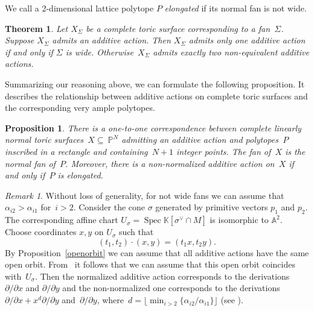 \documentclass[a4paper,draft,reqno,12pt]{amsart}
\newtheorem{proposition}{Proposition}
\newtheorem{theorem}{Theorem}
\theoremstyle{definition}
\theoremstyle{definition}
\theoremstyle{remark}
\newtheorem {remark}{Remark}
\DeclareMathOperator{\Spec}{Spec}
\def\BK{{\mathbb K}}
\def\BK{{\mathbb K}}
\def\BP{{\mathbb P}}
\def\BA{{\mathbb A}}
\begin{document}
We call a 2-dimensional lattice polytope $P$ \emph{elongated} if its normal fan is not wide.

\begin{theorem}\label{surfacesuntheorem}\cite[Theorem 3]{DZ} Let $X_\Sigma$ be a complete toric surface corresponding to a fan~$\Sigma$. Suppose $X_\Sigma$ admits an additive action. Then $X_\Sigma$ admits only one additive action if and only if $\Sigma$ is wide. Otherwise~$X_\Sigma$ admits exactly two non-equivalent additive actions.

\end{theorem}

Summarizing our reasoning above, we can formulate the following proposition. It describes the relationship between additive actions on complete toric surfaces and the corresponding very ample polytopes. 

\begin{proposition}There is a one-to-one correspondence between complete linearly normal toric surfaces~$X\subseteq~\BP^N$ admitting an additive action and polytopes~$P$ inscribed in a rectangle and containing~$N+1$ integer points. The fan of~$X$ is the normal fan of~$P$.
Moreover, there is a non-normalized additive action on~$X$ if and only if~$P$ is elongated.
\end{proposition}

\begin{remark}\label{derivationweight}
    Without loss of generality, for not wide fans we can assume that $\alpha_{i2}>\alpha_{i1}$ for~$i>2$. Consider the cone $\sigma$ generated by primitive vectors $p_1$ and $p_2$. The corresponding affine chart $U_\sigma=\Spec\BK[\sigma^{\vee}\cap M]$ is isomorphic to $\BA^2$. Choose coordinates $x, y$ on $U_\sigma$ such that\begin{equation*}
        (t_1,t_2)\cdot(x,y) = (t_1x,t_2y).
    \end{equation*} By Proposition~\ref{openorbit} we can assume that all additive actions have the same open orbit. From~\cite[Section 6]{DZ} it follows that we can assume that this open orbit coincides with~$U_\sigma$. Then the normalized additive action corresponds to the derivations $\partial/\partial x$ and $\partial/\partial y$ and the non-normalized one corresponds to the derivations $\partial/\partial x + x^d\partial/\partial y$ and~$\partial/\partial y$, where~$d =\lfloor\min_{i>2}\{\alpha_{i2}/\alpha_{i1}\}\rfloor$ (see \cite[Section 6 and Lemma 7]{DZ}).
\end{remark}
\end{document}
